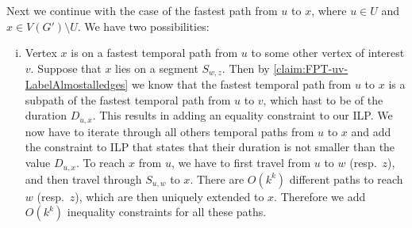 \documentclass[11pt,a4paper]{article}
\theoremstyle{remark}
\theoremstyle{definition}
\begin{document}
Next we continue with the case of the fastest path from $u$ to $x$, where $u \in U$ and $x \in V(G') \setminus U$.
We have two possibilities:
\begin{enumerate}[(i)]
    \item Vertex $x$ is on a fastest temporal path from $u$ to some other vertex of interest $v$.
    Suppose that $x$ lies on a segment $S_{w,z}$.
    Then by \cref{claim:FPT-uv-LabelAlmostalledges} we know that the fastest temporal path from $u$ to $x$ is a subpath of the fastest temporal path from $u$ to $v$,
    which hast to be of the duration $D_{u,x}$. This results in adding an equality constraint to our ILP.
    We now have to iterate through all others temporal paths from $u$ to $x$ and add the constraint to ILP that states that their duration is not smaller than the value $D_{u,x}$.
    To reach $x$ from $u$, we have to first travel from $u$ to $w$ (resp.~$z$), and then travel through $S_{u,w}$ to $x$.
    There are $O(k^k)$ different paths to reach $w$ (resp.~$z$), which are then uniquely extended to $x$.
    Therefore we add $O(k^k)$ inequality constraints for all these paths.
    

\end{enumerate}
\end{document}
